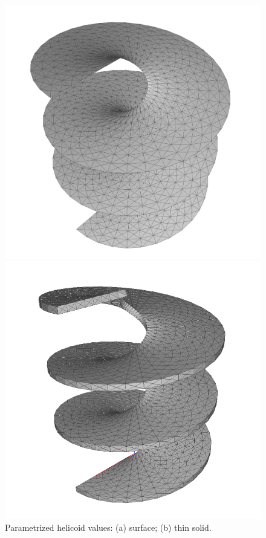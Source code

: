 \begin{coding}
\begin{figure}[htbp] %
\centering
\begin{minipage}[c]{0.38\textwidth}
   \includegraphics[width=\linewidth,height=\linewidth]{chapter-04/figs/surf-helicoid}%
\end{minipage}
\begin{minipage}[c]{0.38\textwidth}
   \includegraphics[width=\linewidth,height=\linewidth]{chapter-04/figs/solid-helicoid}%
\end{minipage}%
\caption{Parametrized helicoid values: (a) surface; (b) thin solid.}\label{fig:helicoid}
\end{figure}



\end{coding}

